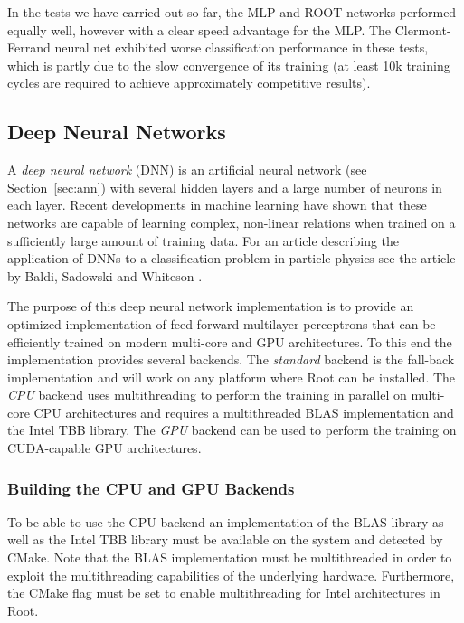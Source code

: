 In the tests we have carried out so far, the MLP and ROOT networks performed equally well, 
however with a clear speed advantage for the MLP. The Clermont-Ferrand neural net
exhibited worse classification performance in these tests, which is partly due to the slow 
convergence of its training (at least 10k training cycles are required to achieve 
approximately competitive results). 

\subsection{Deep Neural Networks }
\label {sec:dnn}

A \textit{deep neural network} (DNN) is an artificial neural network
(see Section~\ref{sec:ann}) with several hidden layers and a large
number of neurons in each layer. Recent developments in machine
learning have shown that these networks are capable of learning
complex, non-linear relations when trained on a sufficiently large
amount of training data. For an article describing the application of
DNNs to a classification problem in particle physics see the article
by Baldi, Sadowski and Whiteson \cite{higgs_dnn}.

The purpose of this deep neural network implementation is to provide
an optimized implementation of feed-forward multilayer perceptrons
that can be efficiently trained on modern multi-core and GPU
architectures. To this end the implementation provides several
backends. The \textit{standard} backend is the fall-back
implementation and will work on any platform where Root can be
installed. The \textit{CPU} backend uses multithreading to perform
the training in parallel on multi-core CPU architectures and requires
a multithreaded BLAS implementation and the Intel TBB library. The
\textit{GPU} backend can be used to perform the training on
CUDA-capable GPU architectures.

\subsubsection{Building the CPU and GPU Backends}

To be able to use the CPU backend an implementation of the BLAS
library as well as the Intel TBB library must be available on the
system and detected by CMake. Note that the BLAS implementation must be
multithreaded in order to exploit the multithreading capabilities of
the underlying hardware. Furthermore, the  CMake flag must be set
to enable multithreading for Intel architectures in Root.

